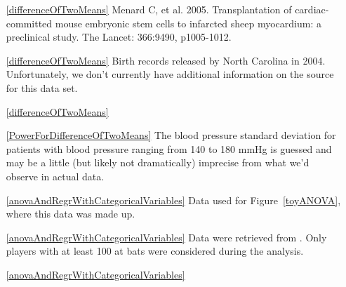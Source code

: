 \begin{itemize}
\item[\ref{differenceOfTwoMeans}]
        {Menard C, et al. 2005.
            Transplantation of cardiac-committed mouse
            embryonic
            stem cells to infarcted sheep myocardium:
            a preclinical study.
            The Lancet: 366:9490, p1005-1012.}
\item[\ref{differenceOfTwoMeans}]
    Birth records released by North Carolina in 2004.
    Unfortunately, we don't currently have additional
    information on the source for this data set.
\item[\ref{differenceOfTwoMeans}]
    \madeup{}

\item[\ref{PowerForDifferenceOfTwoMeans}]
    The blood pressure standard deviation for patients
    with blood pressure ranging from 140 to 180 mmHg
    is guessed and may be a little
    (but likely not dramatically)
    imprecise from what we'd observe in actual data.

\item[\ref{anovaAndRegrWithCategoricalVariables}]
    Data used for Figure~\ref{toyANOVA},
    where this data was made up.
\item[\ref{anovaAndRegrWithCategoricalVariables}]
    Data were retrieved from
    .
    Only players with at least 100 at bats were considered
    during the analysis.
\item[\ref{anovaAndRegrWithCategoricalVariables}]
    \madeup{}

\end{itemize}






\section{}
\label{ch_regr_simple_linear_data}

